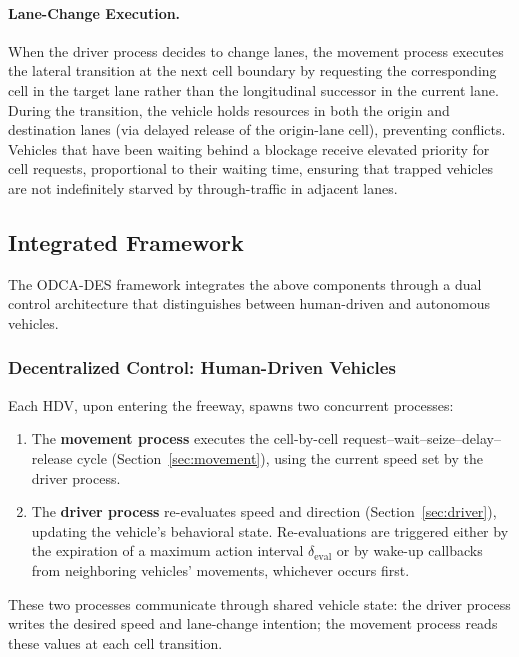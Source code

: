 \documentclass[review,authoryear]{elsarticle}
\begin{document}
\paragraph{Lane-Change Execution.}
When the driver process decides to change lanes, the movement process executes the lateral transition at the next cell boundary by requesting the corresponding cell in the target lane rather than the longitudinal successor in the current lane. During the transition, the vehicle holds resources in both the origin and destination lanes (via delayed release of the origin-lane cell), preventing conflicts. Vehicles that have been waiting behind a blockage receive elevated priority for cell requests, proportional to their waiting time, ensuring that trapped vehicles are not indefinitely starved by through-traffic in adjacent lanes.


\subsection{Integrated Framework}
\label{sec:integrated}

The ODCA-DES framework integrates the above components through a dual control architecture that distinguishes between human-driven and autonomous vehicles.

\subsubsection{Decentralized Control: Human-Driven Vehicles}

Each HDV, upon entering the freeway, spawns two concurrent processes:

\begin{enumerate}
    \item The \textbf{movement process} executes the cell-by-cell request--wait--seize--delay--release cycle (Section~\ref{sec:movement}), using the current speed set by the driver process.

    \item The \textbf{driver process} re-evaluates speed and direction (Section~\ref{sec:driver}), updating the vehicle's behavioral state. Re-evaluations are triggered either by the expiration of a maximum action interval $\delta_{\text{eval}}$ or by wake-up callbacks from neighboring vehicles' movements, whichever occurs first.
\end{enumerate}

These two processes communicate through shared vehicle state: the driver process writes the desired speed and lane-change intention; the movement process reads these values at each cell transition.
\end{document}
